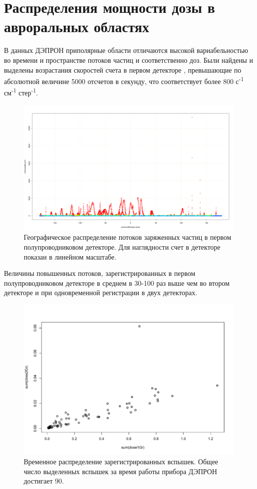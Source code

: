 \section{Распределения мощности дозы в авроральных областях}
В  данных  ДЭПРОН приполярные области отличаются высокой вариабельностью во времени и пространстве потоков частиц и соответственно доз. Были найдены и выделены возрастания скоростей счета в первом детекторе	\label{fig:depronlatmap148}, превышающие по абсолютной величине 5000 отсчетов в секунду, что соответствует более 800 с\textsuperscript{-1} см\textsuperscript{-1} стер\textsuperscript{-1}. 
\begin{figure}[h]
	\centering
	\includegraphics[width=0.8\linewidth]{images/Flash/depron_lat_map_148}
	\caption{Географическое распределение потоков заряженных частиц в первом полупроводниковом детекторе. Для наглядности счет в детекторе показан в линейном масштабе.}
	\label{fig:depronlatmap148}
\end{figure}
Величины повышенных потоков, зарегистрированных в первом полупроводниковом детекторе в среднем в 30-100 раз выше чем во втором детекторе и при одновременной регистрации в двух детекторах.
\begin{figure}[h]
	\centering
	\includegraphics[width=0.7\linewidth]{images/Flash/Rplot03}
	\caption{Временное распределение зарегистрированных вспышек. Общее число выделенных вспышек за время работы прибора ДЭПРОН достигает 90.}
	\label{fig:rplot03}
\end{figure}

